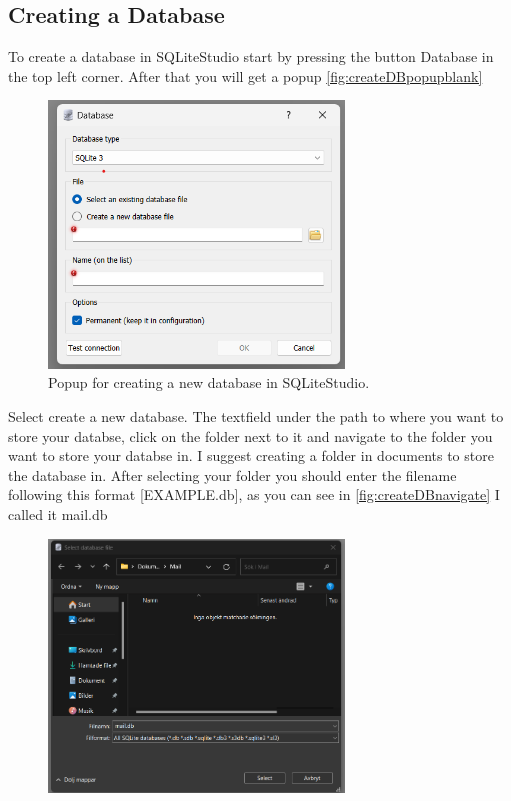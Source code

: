 \documentclass[a4paper,11pt,oneside]{article}
\begin{document}
\begin{sloppypar}
\subsection{Creating a Database}
\label{sqliteStudioCreatingDatabase}
To create a database in SQLiteStudio start by pressing the button Database in the top left corner. After that you will get a popup \autoref{fig:createDBpopupblank}
\begin{figure}[!htb]
  \centering
  \includegraphics[width=0.7\textwidth]{sqlitestudio/create_database/create_database_popup.png}
  \caption{Popup for creating a new database in SQLiteStudio.}
  \label{fig:createDBpopupblank}
\end{figure}
Select create a new database. The textfield under the path to where you want to store your databse, click on the folder next to it and navigate to the folder you want to store your databse in. I suggest creating a folder in documents to store the database in. After selecting your folder you should enter the filename following this format [EXAMPLE.db], as you can see in \autoref{fig:createDBnavigate} I called it mail.db  
\begin{figure}[!htb]
  \centering
  \includegraphics[width=0.7\textwidth]{sqlitestudio/create_database/create_database_navigate.png}

\end{figure}
\end{sloppypar}
\end{document}
